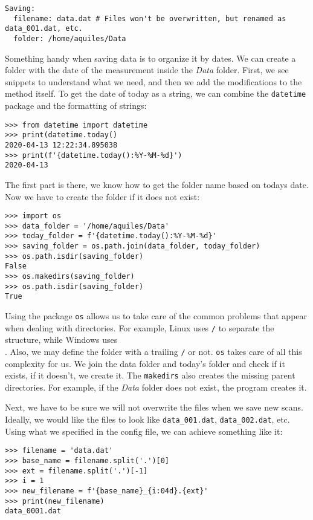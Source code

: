 \begin{verbatim}
Saving:
  filename: data.dat # Files won't be overwritten, but renamed as data_001.dat, etc.
  folder: /home/aquiles/Data
\end{verbatim}

Something handy when saving data is to organize it by dates. We can create a folder with the date of the measurement inside the \emph{Data} folder. First, we see snippets to understand what we need, and then we add the modifications to the method itself. To get the date of today as a string, we can combine the \texttt{datetime} package and the formatting of strings:

\begin{verbatim}
>>> from datetime import datetime
>>> print(datetime.today()
2020-04-13 12:22:34.895038
>>> print(f'{datetime.today():%Y-%M-%d}')
2020-04-13
\end{verbatim}

The first part is there, we know how to get the folder name based on todays date. Now we have to create the folder if it does not exist:

\begin{verbatim}
>>> import os
>>> data_folder = '/home/aquiles/Data'
>>> today_folder = f'{datetime.today():%Y-%M-%d}'
>>> saving_folder = os.path.join(data_folder, today_folder)
>>> os.path.isdir(saving_folder)
False
>>> os.makedirs(saving_folder)
>>> os.path.isdir(saving_folder)
True
\end{verbatim}

Using the package \texttt{os} allows us to take care of the common problems that appear when dealing with directories. For example, Linux uses \texttt{/} to separate the structure, while Windows uses \texttt{\\}. Also, we may define the folder with a trailing \texttt{/} or not. \texttt{os} takes care of all this complexity for us. We join the data folder and today's folder and check if it exists, if it doesn't, we create it. The \texttt{makedirs} also creates the missing parent directories. For example, if the \emph{Data} folder does not exist, the program creates it.

Next, we have to be sure we will not overwrite the files when we save new scans. Ideally, we would like the files to look like \texttt{data\_001.dat}, \texttt{data\_002.dat}, etc. Using what we specified in the config file, we can achieve something like it:

\begin{verbatim}
>>> filename = 'data.dat'
>>> base_name = filename.split('.')[0]
>>> ext = filename.split('.')[-1]
>>> i = 1
>>> new_filename = f'{base_name}_{i:04d}.{ext}'
>>> print(new_filename)
data_0001.dat
\end{verbatim}

